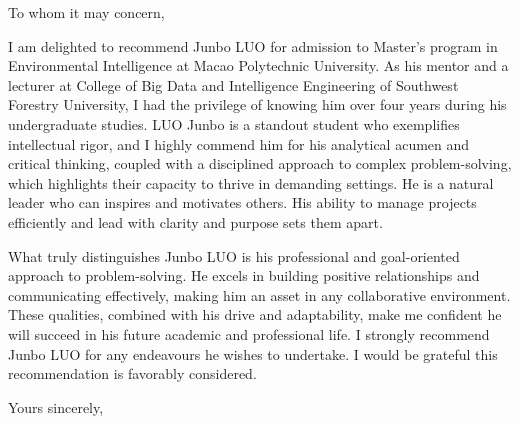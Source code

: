 \documentclass[letter,12pt]{letter}
\begin{document}
\begin{letter}{}

  \address{WANG Xiaolin (Mr.)\\
    Lecturer,\\
    Southwest Forestry University,\\
    Kunming, China\\
    Email: \emph{wx672ster@swfu.edu.cn}\\
    Phone: 86+13577067397
  }
  \signature{WANG Xiaolin}
  \date{\today}

  \opening{To whom it may concern,}

  I am delighted to recommend Junbo LUO for admission to Master's
  program in Environmental Intelligence at Macao Polytechnic
  University.  As his mentor and a lecturer at College of Big Data and
  Intelligence Engineering of Southwest Forestry University, I had the
  privilege of knowing him over four years during his undergraduate
  studies.  LUO Junbo is a standout student who exemplifies
  intellectual rigor, and I highly commend him for his analytical
  acumen and critical thinking, coupled with a disciplined approach to
  complex problem-solving, which highlights their capacity to thrive
  in demanding settings. He is a natural leader who can inspires and
  motivates others. His ability to manage projects efficiently and
  lead with clarity and purpose sets them apart.

  What truly distinguishes Junbo LUO is his professional and
  goal-oriented approach to problem-solving. He excels in building
  positive relationships and communicating effectively, making him an
  asset in any collaborative environment. These qualities, combined
  with his drive and adaptability, make me confident he will succeed
  in his future academic and professional life.  I strongly recommend
  Junbo LUO for any endeavours he wishes to undertake. I would be
  grateful this recommendation is favorably considered.

  \closing{Yours sincerely,}

\end{letter}
\end{document}
